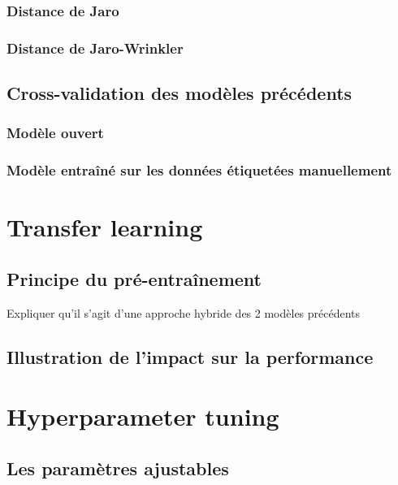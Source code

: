 \documentclass{report}
\begin{document}
            \subsection{Distance de Jaro}

            \subsection{Distance de Jaro-Wrinkler}
    
        \section{Cross-validation des modèles précédents}
            
            \subsection{Modèle \og ouvert \fg}

            \subsection{Modèle entraîné sur les données étiquetées manuellement}

    \chapter{Transfer learning}
        
        \section{Principe du pré-entraînement}
        
        Expliquer qu'il s'agit d'une approche hybride des 2 modèles précédents

        \section{Illustration de l'impact sur la performance}


    \chapter{Hyperparameter tuning}
            
        \section{Les paramètres ajustables}
\end{document}
